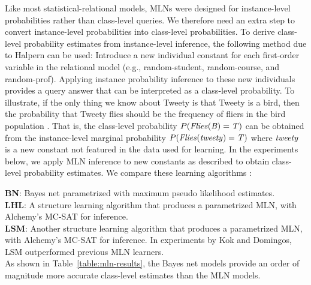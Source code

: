 \documentclass[oribibl]{llncs}
\begin{document}
Like most statistical-relational models, MLNs were designed for instance-level probabilities rather than class-level queries. We therefore need an extra step to convert instance-level probabilities into class-level probabilities. To derive class-level probability estimates from instance-level inference, the following method due to Halpern \cite[fn.3]{Halpern90} can be used: Introduce a new individual constant for each first-order variable in the relational model %
 (e.g., random-student, random-course, and random-prof). Applying instance probability inference to these new individuals provides a query answer that can be interpreted as a class-level probability. To illustrate, if the only thing we know about Tweety is that Tweety is a bird, then the probability that Tweety flies should be the frequency of fliers in the bird population \cite{Schulte2012c}. That is, the class-level probability $P(\it{Flies}(B) = \mathit{T})$ can be obtained from the instance-level marginal probability $P(\it{Flies}(\it{tweety}) = \mathit{T})$ where $\it{tweety}$ is a new constant not featured in the data used for learning. In the experiments below, we apply MLN inference to new constants as described to obtain class-level probability estimates.
%
We compare these learning algorithms \cite{Kok2010}:

\noindent
\textbf{BN}: Bayes net parametrized with maximum pseudo likelihood estimates.\\
\textbf{LHL}: 
A structure learning algorithm that produces a parametrized MLN, with Alchemy's MC-SAT for inference.\\
\textbf{LSM}: Another structure learning algorithm that produces a parametrized MLN, with Alchemy's MC-SAT for inference. In experiments by Kok and Domingos, LSM outperformed previous MLN learners.
\\

As shown in Table~\ref{table:mln-results}, the Bayes net models provide an order of magnitude more accurate class-level estimates than the MLN models.
\end{document}
